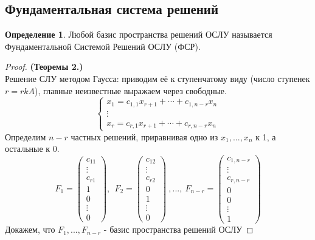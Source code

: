 \documentclass[a4paper, 12pt]{article}
\theoremstyle{definition}
\newtheorem*{definition}{Определение}
\begin{document}
  \subsection{Фундаментальная система решений}
  \begin{definition}
    Любой базис пространства решений ОСЛУ называется \\ Фундаментальной Системой Решений ОСЛУ (ФСР).
  \end{definition} 
  \begin{proof}
    \textbf{(Теоремы 2.)}  \\ Решение СЛУ методом Гаусса: приводим её к ступенчатому виду (число ступенек $r=rkA$), главные неизвестные выражаем через свободные. 
    $$\begin{cases}
      x_1=c_{1,1}x_{r+1} + \cdots + c_{1,n-r}x_n \\
      \vdots\\
      x_r=c_{r,1}x_{r+1} + \cdots + c_{r,n-r}x_n
    \end{cases}$$ 
    Определим $n-r$ частных решений, приравнивая одно из $x_1,...,x_n$ к 1, а остальные к 0. 
    $$F_1 = \begin{pmatrix}
      c_{11}\\
      \vdots\\
      c_{r1}\\
      \hline
      1\\
      0\\
      \vdots\\
      0
    \end{pmatrix}, \ \ F_2 = \begin{pmatrix}
      c_{12}\\
      \vdots\\
      c_{r2}\\
      \hline
      0\\
      1\\
      \vdots\\
      0
    \end{pmatrix} \ ,..., \ F_{n-r} = \begin{pmatrix}
      c_{1,{n-r}}\\
      \vdots\\
      c_{r,{n-r}}\\
      \hline
      0\\
      0\\
      \vdots\\
      1
    \end{pmatrix}$$  
    Докажем, что $F_1,...,F_{n-r}$ - базис пространства решений ОСЛУ 

\end{proof}
\end{document}
